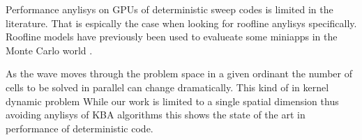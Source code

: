 Performance anylisys on GPUs of deterministic sweep codes is limited in the literature. 
That is espically the case when looking for roofline anylisys specifically.
Roofline models have previously been used to evalueate some miniapps in the Monte Carlo world \citep{tramm2021domain, tramm2022roofline}.


As the wave moves through the problem space in a given ordinant the number of cells to be solved in parallel can change dramatically.
This kind of in kernel dynamic problem 
While our work is limited to a single spatial dimension thus avoiding anylisys of KBA algorithms this shows the state of the art in performance of deterministic code.
\fi
